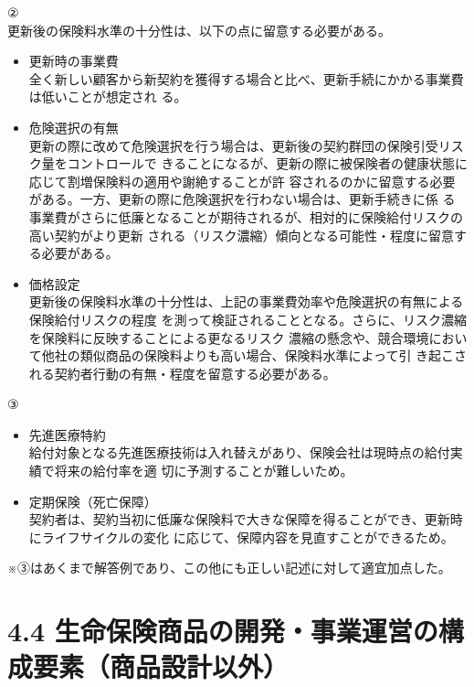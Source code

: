 \documentclass[report,gutter=10mm,fore-edge=10mm,uplatex,dvipdfmx]{jlreq}
\begin{document}
②\\
更新後の保険料水準の十分性は、以下の点に留意する必要がある。
\begin{itemize}
 \item 更新時の事業費\\
 全く新しい顧客から新契約を獲得する場合と比べ、更新手続にかかる事業費は低いことが想定され
 る。
 \item 危険選択の有無\\
 更新の際に改めて危険選択を行う場合は、更新後の契約群団の保険引受リスク量をコントロールで
 きることになるが、更新の際に被保険者の健康状態に応じて割増保険料の適用や謝絶することが許
 容されるのかに留意する必要がある。一方、更新の際に危険選択を行わない場合は、更新手続きに係
 る事業費がさらに低廉となることが期待されるが、相対的に保険給付リスクの高い契約がより更新
 される（リスク濃縮）傾向となる可能性・程度に留意する必要がある。
 \item 価格設定\\
 更新後の保険料水準の十分性は、上記の事業費効率や危険選択の有無による保険給付リスクの程度
 を測って検証されることとなる。さらに、リスク濃縮を保険料に反映することによる更なるリスク
 濃縮の懸念や、競合環境において他社の類似商品の保険料よりも高い場合、保険料水準によって引
 き起こされる契約者行動の有無・程度を留意する必要がある。
\end{itemize}
③
\begin{itemize}
 \item 先進医療特約\\
 給付対象となる先進医療技術は入れ替えがあり、保険会社は現時点の給付実績で将来の給付率を適
 切に予測することが難しいため。
 \item 定期保険（死亡保障）\\
 契約者は、契約当初に低廉な保険料で大きな保障を得ることができ、更新時にライフサイクルの変化
 に応じて、保障内容を見直すことができるため。
\end{itemize}
※③はあくまで解答例であり、この他にも正しい記述に対して適宜加点した。

\section{4.4 生命保険商品の開発・事業運営の構成要素（商品設計以外）}
\end{document}

